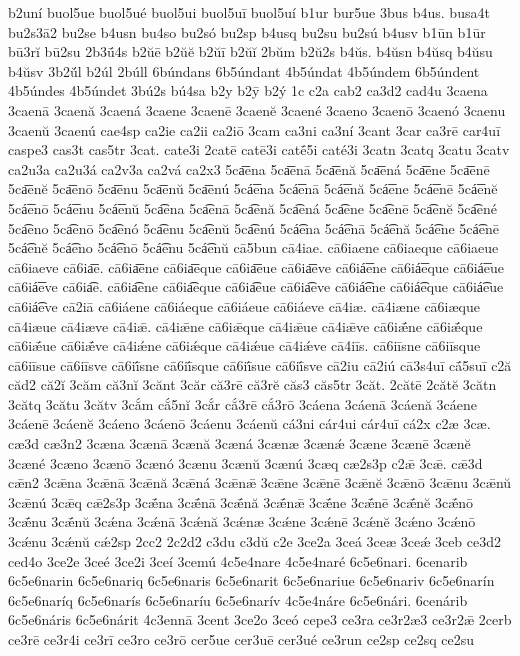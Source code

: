 {b2uní
buol5ue
buol5ué
buol5ui
buol5uī
buol5uí
b1ur
bur5ue
3bus
b4us.
busa4t
bu2s3ā2
bu2se
b4usn
bu4so
bu2só
bu2sp
b4usq
bu2su
bu2sú
b4usv
b1ūn
b1ūr
bū3rĭ
bū2su
2b3ū́4s
b2ŭē
b2ŭĕ
b2ŭī
b2ŭĭ
2bŭm
b2ŭ2s
b4ŭs.
b4ŭsn
b4ŭsq
b4ŭsu
b4ŭsv
3b2ŭ́l
b2úl
2búll
6búndans
6b5úndant
4b5úndat
4b5úndem
6b5úndent
4b5úndes
4b5úndet
3bú2s
bú4sa
b2y
b2ȳ
b2ý
1c
c2a
cab2
ca3d2
cad4u
3caena
3caenā
3caenă
3caená
3caene
3caenē
3caenĕ
3caené
3caeno
3caenō
3caenó
3caenu
3caenŭ
3caenú
cae4sp
ca2ie
ca2ii
ca2iō
3cam
ca3ni
ca3ní
3cant
3car
ca3rē
car4uī
caspe3
cas3t
cas5tr
3cat.
cate3i
2catē
catē3i
catḗ5i
caté3i
3catn
3catq
3catu
3catv
ca2u3a
ca2u3á
ca2v3a
ca2vá
ca2x3
5ca͞ena
5ca͞enā
5ca͞enă
5ca͞ená
5ca͞ene
5ca͞enē
5ca͞enĕ
5ca͞enō
5ca͞enu
5ca͞enŭ
5ca͞enú
5cá͞ena
5cá͞enā
5cá͞enă
5cá͞ene
5cá͞enē
5cá͞enĕ
5cá͞enō
5cá͞enu
5cá͞enŭ
5ca͡ena
5ca͡enā
5ca͡enă
5ca͡ená
5ca͡ene
5ca͡enē
5ca͡enĕ
5ca͡ené
5ca͡eno
5ca͡enō
5ca͡enó
5ca͡enu
5ca͡enŭ
5ca͡enú
5cá͡ena
5cá͡enā
5cá͡enă
5cá͡ene
5cá͡enē
5cá͡enĕ
5cá͡eno
5cá͡enō
5cá͡enu
5cá͡enŭ
cā5bun
cā4iae.
cā6iaene
cā6iaeque
cā6iaeue
cā6iaeve
cā6ia͞e.
cā6ia͞ene
cā6ia͞eque
cā6ia͞eue
cā6ia͞eve
cā6iá͞ene
cā6iá͞eque
cā6iá͞eue
cā6iá͞eve
cā6ia͡e.
cā6ia͡ene
cā6ia͡eque
cā6ia͡eue
cā6ia͡eve
cā6iá͡ene
cā6iá͡eque
cā6iá͡eue
cā6iá͡eve
cā2iā
cā6iáene
cā6iáeque
cā6iáeue
cā6iáeve
cā4iæ.
cā4iæne
cā6iæque
cā4iæue
cā4iæve
cā4iǣ.
cā4iǣne
cā6iǣque
cā4iǣue
cā4iǣve
cā6iǣ́ne
cā6iǣ́que
cā6iǣ́ue
cā6iǣ́ve
cā4iǽne
cā6iǽque
cā4iǽue
cā4iǽve
cā4iīs.
cā6iīsne
cā6iīsque
cā6iīsue
cā6iīsve
cā6iī́sne
cā6iī́sque
cā6iī́sue
cā6iī́sve
cā2iu
cā2iú
cā3s4uī
cā́5suī
c2ă
căd2
că2ĭ
3căm
că3nĭ
3cănt
3căr
că3rē
că3rĕ
căs3
căs5tr
3căt.
2cătē
2cătĕ
3cătn
3cătq
3cătu
3cătv
3cắm
cắ5nĭ
3cắr
cắ3rē
cắ3rō
3cáena
3cáenā
3cáenă
3cáene
3cáenē
3cáenĕ
3cáeno
3cáenō
3cáenu
3cáenŭ
cá3ni
cár4ui
cár4uī
cá2x
c2æ
3cæ.
cæ3d
cæ3n2
3cæna
3cænā
3cænă
3cæná
3cænæ
3cænǽ
3cæne
3cænē
3cænĕ
3cæné
3cæno
3cænō
3cænó
3cænu
3cænŭ
3cænú
3cæq
cæ2s3p
c2ǣ
3cǣ.
cǣ3d
cǣn2
3cǣna
3cǣnā
3cǣnă
3cǣná
3cǣnǣ
3cǣne
3cǣnē
3cǣnĕ
3cǣnō
3cǣnu
3cǣnŭ
3cǣnú
3cǣq
cǣ2s3p
3cǣ́na
3cǣ́nā
3cǣ́nă
3cǣ́nǣ
3cǣ́ne
3cǣ́nē
3cǣ́nĕ
3cǣ́nō
3cǣ́nu
3cǣ́nŭ
3cǽna
3cǽnā
3cǽnă
3cǽnæ
3cǽne
3cǽnē
3cǽnĕ
3cǽno
3cǽnō
3cǽnu
3cǽnŭ
cǽ2sp
2cc2
2c2d2
c3du
c3dŭ
c2e
3ce2a
3ceá
3ceæ
3ceǽ
3ceb
ce3d2
ced4o
3ce2e
3ceé
3ce2i
3ceí
3cemú
4c5e4nare
4c5e4naré
6c5e6nari.
6cenarib
6c5e6narin
6c5e6nariq
6c5e6naris
6c5e6narit
6c5e6nariue
6c5e6nariv
6c5e6narín
6c5e6naríq
6c5e6narís
6c5e6naríu
6c5e6narív
4c5e4náre
6c5e6nári.
6cenárib
6c5e6náris
6c5e6nárit
4c3ennā
3cent
3ce2o
3ceó
cepe3
ce3ra
ce3r2æ3
ce3r2ǣ
2cerb
ce3rē
ce3r4i
ce3rī
ce3ro
ce3rō
cer5ue
cer3uē
cer3ué
ce3run
ce2sp
ce2sq
ce2su
}

